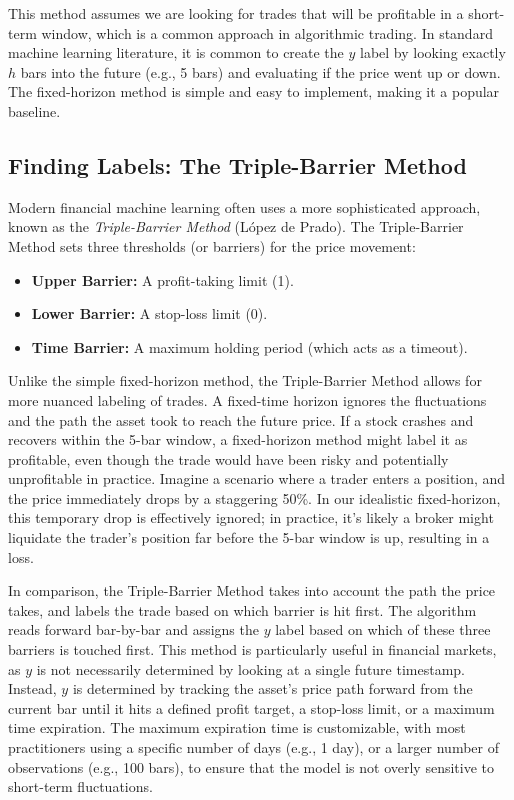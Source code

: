 This method assumes we are looking for trades that will be profitable in a short-term window, which is a common approach in algorithmic trading. 
In standard machine learning literature, it is common to create the $y$ label by looking exactly $h$ bars into the future (e.g., 5 bars) and evaluating if the price went up or down.
The fixed-horizon method is simple and easy to implement, making it a popular baseline.

\subsection{Finding Labels: The Triple-Barrier Method}

Modern financial machine learning often uses a more sophisticated approach, known as the \textit{Triple-Barrier Method} (L\'opez de Prado). 
The Triple-Barrier Method sets three thresholds (or barriers) for the price movement:

\begin{itemize}
  \item \textbf{Upper Barrier:} A profit-taking limit (1).
  \item \textbf{Lower Barrier:} A stop-loss limit (0).
  \item \textbf{Time Barrier:}  A maximum holding period (which acts as a timeout).
\end{itemize}

Unlike the simple fixed-horizon method, the Triple-Barrier Method allows for more nuanced labeling of trades.
A fixed-time horizon ignores the fluctuations and the path the asset took to reach the future price. 
If a stock crashes and recovers within the 5-bar window, a fixed-horizon method might label it as profitable, even though the trade would have been risky and potentially unprofitable in practice. 
Imagine a scenario where a trader enters a position, and the price immediately drops by a staggering 50\%. 
In our idealistic fixed-horizon, this temporary drop is effectively ignored; in practice, it's likely a broker might liquidate the trader's position far before the 5-bar window is up, resulting in a loss.

In comparison, the Triple-Barrier Method takes into account the path the price takes, and labels the trade based on which barrier is hit first. 
The algorithm reads forward bar-by-bar and assigns the $y$ label based on which of these three barriers is touched first. 
This method is particularly useful in financial markets, as $y$ is not necessarily determined by looking at a single future timestamp. 
Instead, $y$ is determined by tracking the asset's price path forward from the current bar until it hits a defined profit target, a stop-loss limit, or a maximum time expiration. 
The maximum expiration time is customizable, with most practitioners using a specific number of days (e.g., 1 day), or a larger number of observations (e.g., 100 bars), to ensure that the model is not overly sensitive to short-term fluctuations.

